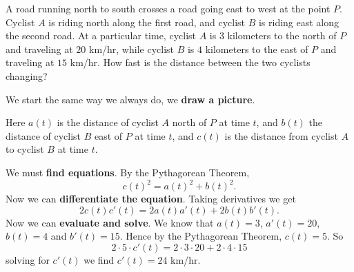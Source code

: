\documentclass{ximera}
\begin{document}
\begin{example}
A road running north to south crosses a road going east to west at the
point $P$.  Cyclist $A$ is riding north along the first road, and
cyclist $B$ is riding east along the second road.  At a particular
time, cyclist $A$ is $3$ kilometers to the north of $P$ and traveling
at $20$ km/hr, while cyclist $B$ is $4$ kilometers to the east of $P$
and traveling at $15$ km/hr.  How fast is the distance between the two
cyclists changing?


\begin{explanation}
We start the same way we always do, we \textbf{draw a picture}.
\begin{image}
\end{image}
Here $a(t)$ is the distance of cyclist $A$ north of $P$ at time $t$,
and $b(t)$ the distance of cyclist $B$ east of $P$ at time $t$, and
$c(t)$ is the distance from cyclist $A$ to cyclist $B$ at time $t$.

We must \textbf{find equations}.  By the Pythagorean Theorem,
\[
c(t)^2=a(t)^2+b(t)^2.
\] 
Now we can \textbf{differentiate the equation}. Taking derivatives we
get
\[
2c(t)c'(t)=2a(t)a'(t)+2b(t)b'(t).
\]
Now we can \textbf{evaluate and solve}.  We know that $a(t) = 3$,
$a'(t) = 20$, $b(t) = 4$ and $b'(t) = 15$. Hence by the Pythagorean
Theorem, $c(t) = 5$. So
\[
2\cdot 5 \cdot c'(t) = 2 \cdot 3\cdot 20 + 2 \cdot 4 \cdot 15
\]
solving for $c'(t)$ we find $c'(t) = 24$ km/hr.
\end{explanation}
\end{example}
\end{document}
